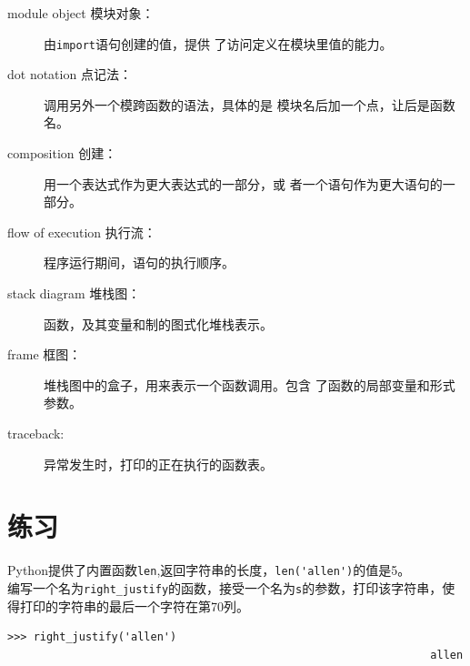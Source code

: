 \begin{description}
\item[module object 模块对象：]由{\tt import}语句创建的值，提供
了访问定义在模块里值的能力。

\item[dot notation 点记法：]调用另外一个模跨函数的语法，具体的是
模块名后加一个点，让后是函数名。

\item[composition 创建：]用一个表达式作为更大表达式的一部分，或
者一个语句作为更大语句的一部分。

\item[flow of execution 执行流：]程序运行期间，语句的执行顺序。


\item[stack diagram 堆栈图：]函数，及其变量和制的图式化堆栈表示。

\item[frame 框图：] 堆栈图中的盒子，用来表示一个函数调用。包含
了函数的局部变量和形式参数。

\item[traceback:] 异常发生时，打印的正在执行的函数表。

\end{description}


\section{练习}

\begin{ex}

Python提供了内置函数{\tt len},返回字符串的长度，\verb"len('allen')"的值是5。\\

编写一个名为\verb"right_justify"的函数，接受一个名为{\tt s}的参数，打印该字符串，使得打印的字符串的最后一个字符在第70列。

\beforeverb
\begin{verbatim}
>>> right_justify('allen')
                                                                 allen
\end{verbatim}
\afterverb

\end{ex}


